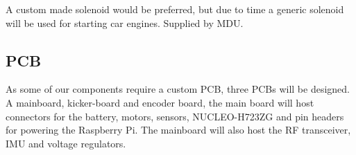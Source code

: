 \documentclass[a4paper,8pt]{article}
\begin{document}
%
%
%
%
%
%
%
%
%
%
%
%
%
%
%
A custom made solenoid would be preferred, but due to time a
generic solenoid will be used for starting car engines.
Supplied by MDU.

\subsection{PCB}

As some of our components require a custom PCB, three PCBs will be designed. A mainboard, kicker-board and encoder board, the main board will host
connectors for the battery, motors, sensors, NUCLEO-H723ZG and pin headers for
powering the Raspberry Pi. The mainboard will also host the RF
transceiver, IMU and voltage regulators.
\end{document}
